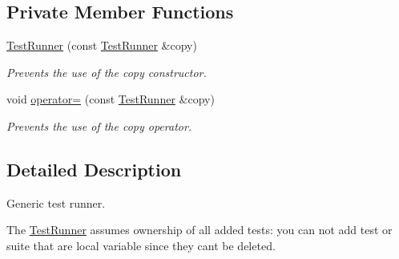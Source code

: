 \subsection*{Private Member Functions}
\begin{DoxyCompactItemize}
\item 
\hyperlink{class_test_runner_ad1e3791a262a8f25bcffbf7c029d3fb7}{Test\+Runner} (const \hyperlink{class_test_runner}{Test\+Runner} \&copy)\hypertarget{class_test_runner_ad1e3791a262a8f25bcffbf7c029d3fb7}{}\label{class_test_runner_ad1e3791a262a8f25bcffbf7c029d3fb7}

\begin{DoxyCompactList}\small\item\em Prevents the use of the copy constructor. \end{DoxyCompactList}\item 
void \hyperlink{class_test_runner_aa8933b61b025c8f9595b455397d81921}{operator=} (const \hyperlink{class_test_runner}{Test\+Runner} \&copy)\hypertarget{class_test_runner_aa8933b61b025c8f9595b455397d81921}{}\label{class_test_runner_aa8933b61b025c8f9595b455397d81921}

\begin{DoxyCompactList}\small\item\em Prevents the use of the copy operator. \end{DoxyCompactList}\end{DoxyCompactItemize}


\subsection{Detailed Description}
Generic test runner.

The \hyperlink{class_test_runner}{Test\+Runner} assumes ownership of all added tests\+: you can not add test or suite that are local variable since they can\textquotesingle{}t be deleted. 

